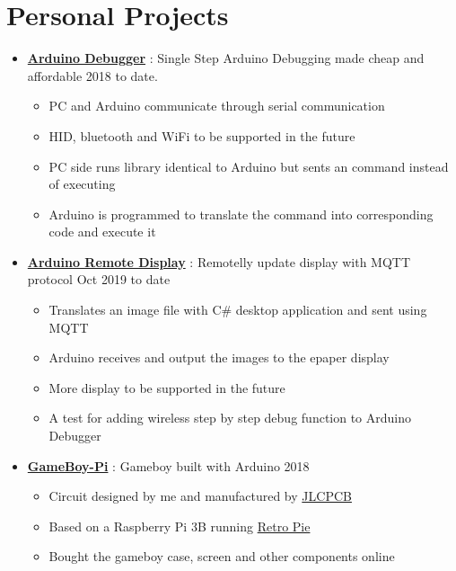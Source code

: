   \section{Personal Projects}

  \begin{itemize}

    \item \href{https://github.com/RustColeone/ArduinoDebugger}{\color{link}\textbf{Arduino Debugger}} : Single Step Arduino Debugging made cheap and affordable \dashdiv{} 2018 to date.

    \begin{itemize}
      \item PC and Arduino communicate through serial communication
      \item HID, bluetooth and WiFi to be supported in the future
      \item PC side runs library identical to Arduino but sents an command instead of executing
      \item Arduino is programmed to translate the command into corresponding code and execute it
    \end{itemize}

    \item \href{https://github.com/RustColeone/ArduinoRemoteDisplay}{\color{link}\textbf{Arduino Remote Display}} : Remotelly update display with MQTT protocol\dashdiv{} Oct 2019 to date

    \begin{itemize}
      \item Translates an image file with C\# desktop application and sent using MQTT
      \item Arduino receives and output the images to the epaper display
      \item More display to be supported in the future
      \item A test for adding wireless step by step debug function to Arduino Debugger
    \end{itemize}

    \item \href{https://github.com/RustColeone/GameBoyPi}{\color{link}\textbf{GameBoy-Pi}} : Gameboy built with Arduino \dashdiv{} 2018

    \begin{itemize}
      \item Circuit designed by me and manufactured by \href{https://jlcpcb.com/}{\color{link}JLCPCB}
      \item Based on a Raspberry Pi 3B running \href{https://retropie.org.uk/}{\color{link}Retro Pie}
      \item Bought the gameboy case, screen and other components online
    \end{itemize}


\end{itemize}
